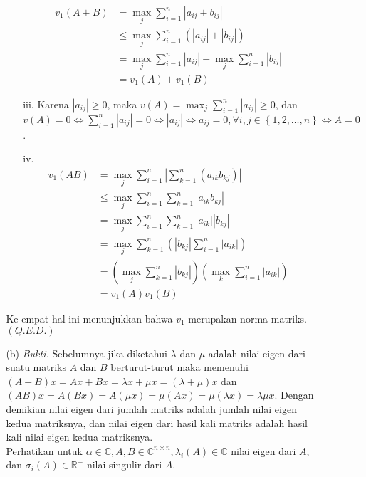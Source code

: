 \documentclass[11pt,a4paper]{article}
\newcommand{\ds}{\displaystyle}
\theoremstyle{plain}
\theoremstyle{definition}
\theoremstyle{remark}
\begin{document}
\begin{enumerate}
\begin{enumerate}
\begin{enumerate}
\begin{enumerate}
\begin{align*}
			v_{1}(A+B) &=\ds \max_{j} \sum_{i=1}^{n} \left| a_{ij}+b_{ij}\right| \\
			&\leq\ds \max_{j} \sum_{i=1}^{n} (\left| a_{ij}\right|+\left| b_{ij}\right|) \\
			&=\ds \max_{j} \sum_{i=1}^{n} \left| a_{ij}\right| + \max_{j} \sum_{i=1}^{n} \left| b_{ij}\right| \\
			&= v_{1}(A)+v_{1}(B)
			\end{align*}
			\item[iii.] Karena $\left| a_{ij}\right| \geq 0$, maka $v(A)=\ds \max_{j} \sum_{i=1}^{n} \left| a_{ij}\right|\geq 0$, dan $\ds v(A)=0 \Leftrightarrow \sum_{i=1}^{n} \left| a_{ij}\right|=0 \Leftrightarrow \left| a_{ij}\right| \Leftrightarrow a_{ij}=0, \forall i,j\in\left\{ 1,2,\ldots,n\right\} \Leftrightarrow A=0$.
			\item[iv.] 
			\begin{align*}
			v_{1}(AB) &= \ds \max_{j} \sum_{i=1}^{n} \left| \sum_{k=1}^{n} (a_{ik}b_{kj})\right| \\
			&\leq \ds \max_{j} \sum_{i=1}^{n} \sum_{k=1}^{n} \left| a_{ik}b_{kj}\right| \\
			&= \ds \max_{j} \sum_{i=1}^{n} \sum_{k=1}^{n} \left| a_{ik} \right| \left|b_{kj}\right| \\
			&= \ds \max_{j} \sum_{k=1}^{n} \left( \left|b_{kj}\right| \sum_{i=1}^{n} \left| a_{ik} \right| \right) \\
			&= \ds \left( \max_{j} \sum_{k=1}^{n} \left| b_{kj}\right|\right) \left( \max_{k} \sum_{i=1}^{n} \left| a_{ik} \right| \right) \\
			&= v_{1}(A)v_{1}(B)
			\end{align*}
		\end{enumerate}
		Ke empat hal ini menunjukkan bahwa $v_{1}$ merupakan norma matriks. $(Q.E.D.)$
		\item[(b)] \textit{Bukti.} Sebelumnya jika diketahui $\lambda$ dan $\mu$ adalah nilai eigen dari suatu matriks $A$ dan $B$ berturut-turut maka memenuhi $(A+B)x = Ax+Bx=\lambda x+ \mu x=(\lambda +\mu)x$ dan $(AB)x=A(Bx) = A(\mu x) = \mu (Ax)=\mu (\lambda x) = \lambda \mu x$. Dengan demikian nilai eigen dari jumlah matriks adalah jumlah nilai eigen kedua matriksnya, dan nilai eigen dari hasil kali matriks adalah hasil kali nilai eigen kedua matriksnya.\\
		Perhatikan untuk $\alpha\in \mathbb{C}, A,B \in \mathbb{C}^{n\times n}, \lambda_{i}(A)\in \mathbb{C}$ nilai eigen dari $A$, dan $\sigma_{i}(A)\in \mathbb{R}^{+}$ nilai singulir dari $A$. 
		\begin{enumerate}

\end{enumerate}
\end{enumerate}
\end{enumerate}
\end{enumerate}
\end{document}
